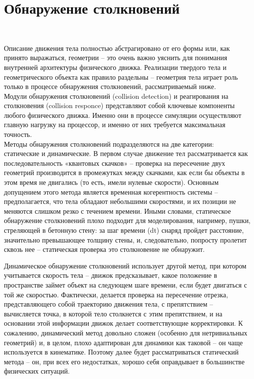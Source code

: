 \chapter{Обнаружение столкновений}
\

Описание движения тела полностью абстрагировано от его формы
или, как принято выражаться, геометрии – это очень важно
уяснить для понимания внутренней архитектуры физического
движка. Реализации твердого тела и геометрического объекта
как правило раздельны – геометрия тела играет роль только в
процессе обнаружения столкновений, рассматриваемый ниже.
\\

Модули обнаружения столкновений (collision detection) и 
реагирования на столкновения (collision responce) представляют 
собой ключевые компоненты любого физического движка. Именно
они в процессе симуляции осуществляют главную нагрузку на
процессор, и именно от них требуется максимальная точность.
\\

Методы обнаружения столкновений подразделяются на
две категории: статические и динамические. В первом случае
движение тел рассматривается как последовательность
«квантовых скачков» – проверка на пересечение двух геометрий
производится в промежутках между скачками, как если бы
объекты в этом время не двигались (то есть, имели нулевые
скорости). Основным допущением этого метода является
временная когерентность системы – предполагается, что тела
обладают небольшими скоростями, и их позиции не меняются
слишком резко с течением времени. Иными словами,
статическое обнаружение столкновений плохо подходит для
моделирования, например, пушки, стреляющей в бетонную
стену: за шаг времени (dt) снаряд пройдет расстояние,
значительно превышающее толщину стены, и, следовательно,
попросту пролетит сквозь нее – статическая проверка это
столкновение не обнаружит.

Динамическое обнаружение столкновений использует
другой метод, при котором учитывается скорость тела – движок
предсказывает, какое положение в пространстве займет объект
на следующем шаге времени, если будет двигаться с той же
скоростью. Фактически, делается проверка на пересечение
отрезка, представляющего собой траекторию движения тела, с
препятствием – вычисляется точка, в которой тело столкнется с
этим препятствием, и на основании этой информации движок
делает соответствующие корректировки. К сожалению,
динамический метод довольно сложен (особенно для
нетривиальных геометрий) и, в целом, плохо адаптирован для
динамики как таковой – он чаще используется в кинематике.
Поэтому далее будет рассматриваться статический метода – он,
при всех его недостатках, хорошо себя оправдывает в
большинстве физических ситуаций.
\\

